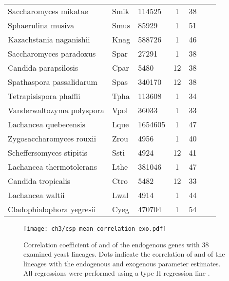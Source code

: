 \begin{table}
\begin{tabular}{  l  l  l  c  c  l  l  }
	Saccharomyces mikatae 		& Smik 		& 114525 		&	1	& 38 	 \\
	Sphaerulina musiva 		& Smus 		& 85929 		&	1	& 51 	 \\ 
	Kazachstania naganishii 	& Knag 		& 588726 		&	1	& 46 	 \\ 
	Saccharomyces paradoxus 	& Spar 		& 27291 		&	1	& 38 	 \\ 
	Candida parapsilosis 		& Cpar 		& 5480 			&	12	& 38 	 \\ 
	Spathaspora passalidarum 	& Spas 		& 340170 		&	12	& 38 	 \\ 
	Tetrapisispora phaffii 		& Tpha 		& 113608 		&	1	& 34 	 \\ 
	Vanderwaltozyma polyspora 	& Vpol 		& 36033 		&	1	& 33 	 \\ 
	Lachancea quebecensis 		& Lque 		& 1654605 		&	1	& 47 	 \\ 
	Zygosaccharomyces rouxii 	& Zrou 		& 4956 			&	1	& 40 	 \\ 
	Scheffersomyces stipitis 	& Ssti 		& 4924 			&	12	& 41 	 \\ 
	Lachancea thermotolerans 	& Lthe 		& 381046 		&	1	& 47 	 \\ 
	Candida tropicalis 		& Ctro 		& 5482 			&	12	& 33 	 \\ 
	Lachancea waltii 		& Lwal 		& 4914 			&	1	& 44 	 \\ 
	Cladophialophora yegresii 	& Cyeg 		& 470704 		&	1	& 54 	 \\ \hline
\end{tabular}
\label{tab:org_overview}
\end{table}
\clearpage


\null
\vfill
\begin{figure}[H]
     \centering
	\texttt{[image: ch3/csp\_mean\_correlation\_exo.pdf]}
	\caption{Correlation coefficient of \DM and \DE of the endogenous genes with 38 examined yeast lineages. 
	Dots indicate the correlation of \DM and \DE of the lineages with the endogenous and exogenous parameter estimates. 
	All regressions were performed using a type II regression line \citep{SokalAndRohlf1981}.}
	\label{fig:csp_endo_comp}
\end{figure}
\null
\vfill
\clearpage
\null
\vfill

